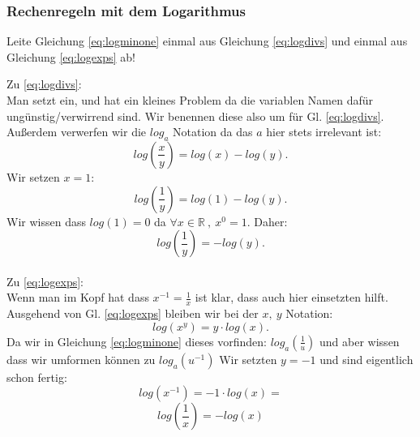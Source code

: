 \subsubsection{Rechenregeln mit dem Logarithmus}



\begin{question}
    Leite Gleichung \ref{eq:logminone} einmal aus Gleichung \ref{eq:logdivs} und einmal aus Gleichung \ref{eq:logexps} ab! 
\end{question}

\begin{answer}
Zu \ref{eq:logdivs}: \\
Man setzt ein, und hat ein kleines Problem da die variablen Namen dafür ungünstig/verwirrend sind. Wir benennen diese also um für Gl. \ref{eq:logdivs}. Außerdem verwerfen wir die $log_a$ Notation da das $a$ hier stets irrelevant ist:
$$ log \left(\frac{x}{y}\right) = log(x) - log(y).$$ 
Wir setzen $x=1$:
$$ log \left(\frac{1}{y}\right) = log(1) - log(y).$$
Wir wissen dass $log(1) = 0$ da $\forall x \in \mathbb{R} \: , \: x^0 = 1$. 
Daher: $$ log \left(\frac{1}{y}\right) = - log(y).$$ \\

Zu \ref{eq:logexps}: \\
Wenn man im Kopf hat dass $x^{-1}=\frac{1}{x}$ ist klar, dass auch hier einsetzten hilft. Ausgehend von Gl. \ref{eq:logexps} bleiben wir bei der $x, \: y$ Notation:
$$log (x ^ y) = y \cdot log(x).$$
Da wir in Gleichung \ref{eq:logminone} dieses vorfinden: $log_a \left( \frac{1}{u} \right)$ und aber wissen dass wir umformen können zu $log_a ( u^{-1}) $ 
Wir setzten $y=-1$ und sind eigentlich schon fertig:
$$log (x ^ {-1}) = -1 \cdot log(x) = $$
$$log \left( \frac{1}{x} \right) = -log(x)$$

\end{answer} 

